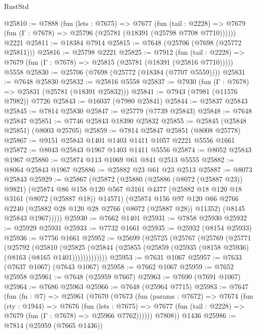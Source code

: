 \begin{lexlean}{RustStd}
\begin{coremodule}
@25810 := @7888
    (fun (lets : @7675) =>
    @7677
      (fun (tail : @2228) =>
      @7679 (fun (Γ : @7678) => @25796 (@25781 (@18391 (@25798 @7708 @7710))))))
    @2221
@25811 := @18384 @7914
@25815 := @7648 (@25706 (@7698 (@25772 @25811)))
@25816 := @25798 @2221
@25825 := @7912
    (fun (tail : @2228) => @7679 (fun (Γ : @7678) => @25815 (@25781 (@18391 (@25816 @7710)))))
    @5558
@25830 := @25706 (@7698 (@25772 (@18384 (@7707 @5559))))
@25831 := @7648 @25830
@25832 := @25816 @5558
@25837 := @7930 (fun (Γ : @7678) => @25831 (@25781 (@18391 @25832)))
@25841 := @7943 (@7981 (@11576 @7982)) @7726
@25843 := @16037 (@7980 @25841)
@25844 := @25837 @25843
@25845 := @7814 @25830
@25847 := @25779 (@7739 @25843)
@25848 := @7648 @25847
@25851 := @7746 @25843 @18390 @25832
@25855 := @25845 (@25848 @25851) (@8003 @25705)
@25859 := @7814 @25847 @25851 (@8008 @25778)
@25867 := @9151 @25843 @1401 @1403 @1411 @1057 @2221 @5556 @1661
@25872 := @8043 @25843 @1967 @1403 @1411 @5556
@25874 := @8052 @25843 @1967
@25880 := @25874 @113 @1069 @61 @841 @2513 @5555
@25882 := @8064 @25843 @1967
@25886 := @25882 @23 @61 @23 @2513
@25887 := @8073 @25843
@25929 := @25867
    (@25872
      (@25880
        (@25886 (@8072 (@25887 @23)) @9821)
        (@25874
          @86
          @158
          @120
          @567
          @3161
          @4377
          (@25882 @18 @120 @18 @3161 (@8072 (@25887 @18)) @14571)
          (@25874
            @156
            @97
            @120
            @66
            @2766
            @2240
            (@25882 @28 @120 @28 @2766 (@8072 (@25887 @28)) @11352)
            (@8145 @25843 @1967)))))
@25930 := @7662 @1401
@25931 := @7858 @25930
@25932 := @25929 @25931
@25933 := @7732 @1661
@25935 := @25932 (@8154 @25933)
@25936 := @7756 @1661
@25952 := @25699
    (@25725
      (@25767
        (@25769
          (@25771
            (@25792
              (@25810
                (@25825
                  (@25844 (@25855 (@25859 (@25935 (@8158 @25936) (@8163 (@8165 @1401)))))))))))))
@25953 := @7631 @1067
@25957 := @7633 (@7637 @1067) (@7643 @1067)
@25958 := @7662 @1067
@25959 := @7652 @25958
@25961 := @7648 (@25959 @7667)
@25963 := @7690 (@7691 @1067)
@25964 := @7686 @25963
@25966 := @7648 (@25964 @7715)
@25983 := @7647
    (fun (fn : @7) =>
    @25961
      (@7670
        (@7673
          (fun (params : @7672) =>
          @7674
            (fun (rty : @1944) =>
            @7676
              (fun (lets : @7675) =>
              @7677 (fun (tail : @2228) => @7679 (fun (Γ : @7678) => @25966 @7762))))))
        @7808))
    @1436
@25986 := @7814 (@25959 (@7665 @1436))

\end{coremodule}
\end{lexlean}

